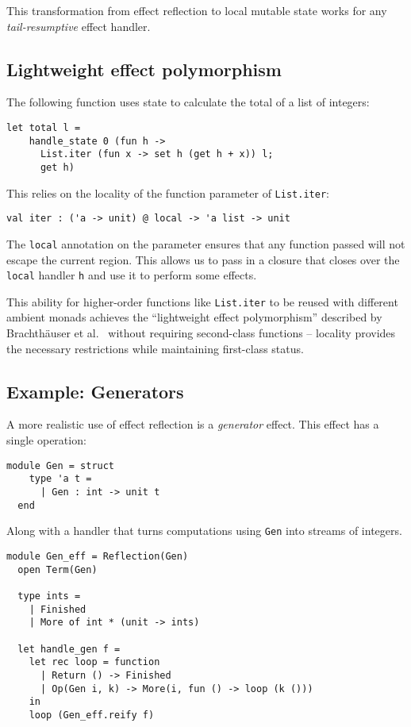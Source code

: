 \documentclass[acmsmall, screen, review, anonymous]{acmart}
\theoremstyle{definition}
\begin{document}
This transformation from effect reflection to local mutable state works
for any \emph{tail-resumptive} effect handler.

\subsection{Lightweight effect polymorphism}

The following function uses state to calculate the total of a list of
integers:
\begin{lstlisting}[style=oxcaml]
  let total l =
    handle_state 0 (fun h ->
      List.iter (fun x -> set h (get h + x)) l;
      get h)
\end{lstlisting}
This relies on the locality of the function parameter of
\lstinline[style=oxcaml]{List.iter}:
\begin{lstlisting}[style=oxcaml]
  val iter : ('a -> unit) @ local -> 'a list -> unit
\end{lstlisting}
The \lstinline[style=oxcaml]{local} annotation on the parameter ensures
that any function passed will not escape the current region. This allows
us to pass in a closure that closes over the
\lstinline[style=oxcaml]{local} handler \lstinline[style=oxcaml]{h} and
use it to perform some effects.

This ability for higher-order functions like
\lstinline[style=oxcaml]{List.iter} to be reused with different ambient
monads achieves the ``lightweight effect polymorphism'' described by
Brachth{\"a}user et al.~\cite{brachthauser2020effects} without requiring
second-class functions -- locality provides the necessary restrictions
while maintaining first-class status.

\subsection{Example: Generators}

A more realistic use of effect reflection is a \emph{generator}
effect. This effect has a single operation:
\begin{lstlisting}[style=oxcaml]
  module Gen = struct
    type 'a t =
      | Gen : int -> unit t
  end
\end{lstlisting}
Along with a handler that turns computations using
\lstinline[style=oxcaml]{Gen} into streams of integers.
\begin{lstlisting}[style=oxcaml]
  module Gen_eff = Reflection(Gen)
  open Term(Gen)

  type ints =
    | Finished
    | More of int * (unit -> ints)

  let handle_gen f =
    let rec loop = function
      | Return () -> Finished
      | Op(Gen i, k) -> More(i, fun () -> loop (k ()))
    in
    loop (Gen_eff.reify f)

\end{lstlisting}
\end{document}
